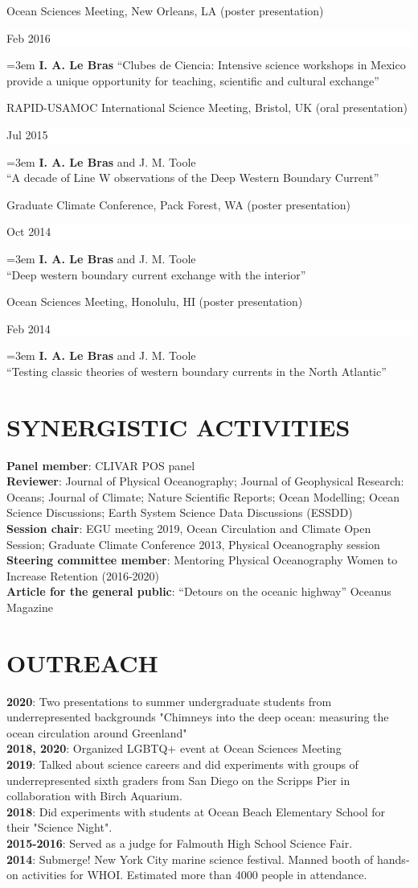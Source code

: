\documentclass[paper=letter,fontsize=11pt]{scrartcl} %
\newcommand{\sepspace}{\vspace*{3mm}}		%
\newcommand{\NewPart}[2]{\section*{\uppercase{#1} #2}}
\newcommand{\ShortEntry}[2]{\normalsize \noindent \textbf{#1}: #2 \\ }
\newcommand{\ConfEntry}[5]{
		\noindent #1 (#2) \hfill      %
		\colorbox{White}{%
			\parbox{6em}{%
			\hfill\color{Black}#3}} \par %
		\noindent \hangindent=3em\hangafter=0 #4 ``#5'' \sepspace}
\begin{document}
\ConfEntry{Ocean Sciences Meeting, New Orleans, LA}{poster presentation}{Feb 2016}{\textbf{I. A. Le Bras}}{Clubes de Ciencia: Intensive science workshops in Mexico provide a unique opportunity for teaching, scientific and cultural exchange}

\ConfEntry{RAPID-USAMOC International Science Meeting, Bristol, UK}{oral presentation}{Jul 2015}{\textbf{I. A. Le Bras} and J. M. Toole\\}{A decade of Line W observations of the Deep Western Boundary Current}

\ConfEntry{Graduate Climate Conference, Pack Forest, WA}{poster presentation}{Oct 2014}{\textbf{I. A. Le Bras} and J. M. Toole\\}{Deep western boundary current exchange with the interior}

\ConfEntry{Ocean Sciences Meeting, Honolulu, HI}{poster presentation}{Feb 2014}{\textbf{I. A. Le Bras} and J. M. Toole\\}{Testing classic theories of western boundary currents in the North Atlantic}

\NewPart{Synergistic Activities}{}
\ShortEntry{Panel member}{CLIVAR POS panel}
\ShortEntry{Reviewer}{Journal of Physical Oceanography; Journal of Geophysical Research: Oceans; Journal of Climate; Nature Scientific Reports; Ocean Modelling; Ocean Science Discussions; Earth System Science Data Discussions (ESSDD)}
\ShortEntry{Session chair}{EGU meeting 2019, Ocean Circulation and Climate Open Session; Graduate Climate Conference 2013, Physical Oceanography session}
\ShortEntry{Steering committee member}{Mentoring Physical Oceanography Women to Increase Retention (2016-2020)}
\ShortEntry{Article for the general public}{ ``Detours on the oceanic highway'' Oceanus Magazine}

\NewPart{Outreach}{}
\ShortEntry{2020}{Two presentations to summer undergraduate students from underrepresented backgrounds "Chimneys into the deep ocean: measuring the ocean circulation around Greenland"}
\ShortEntry{2018, 2020}{Organized LGBTQ+ event at Ocean Sciences Meeting}
\ShortEntry{2019}{Talked about science careers and did experiments with groups of underrepresented sixth graders from San Diego on the Scripps Pier in collaboration with Birch Aquarium.}
\ShortEntry{2018}{Did experiments with students at Ocean Beach Elementary School for their "Science Night".}
\ShortEntry{2015-2016}{Served as a judge for Falmouth High School Science Fair.}
\ShortEntry{2014}{Submerge! New York City marine science festival. Manned booth of hands-on activities for WHOI. Estimated more than 4000 people in attendance.}
\end{document}
